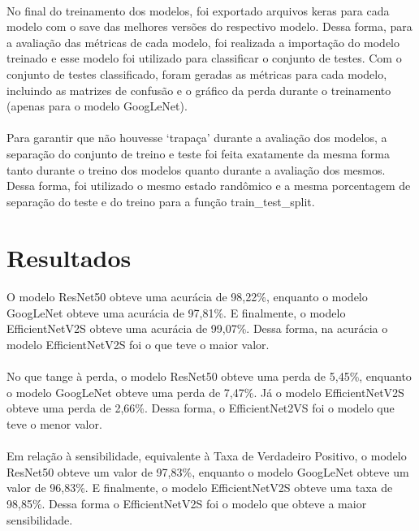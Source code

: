 \documentclass[12pt]{article}
\begin{document}
\paragraph{}No final do treinamento dos modelos, foi exportado arquivos keras para cada modelo com o save das melhores versões do respectivo modelo. Dessa forma, para a avaliação das métricas de cada modelo, foi realizada a importação do modelo treinado e esse modelo foi utilizado para classificar o conjunto de testes. Com o conjunto de testes classificado, foram geradas as métricas para cada modelo, incluindo as matrizes de confusão e o gráfico da perda durante o treinamento (apenas para o modelo GoogLeNet).

\paragraph{}Para garantir que não houvesse ‘trapaça’ durante a avaliação dos modelos, a separação do conjunto de treino e teste foi feita exatamente da mesma forma tanto durante o treino dos modelos quanto durante a avaliação dos mesmos. Dessa forma, foi utilizado o mesmo estado randômico e a mesma porcentagem de separação do teste e do treino para a função train\_test\_split.

\section{Resultados}

\paragraph{}O modelo ResNet50 obteve uma acurácia de 98,22\%, enquanto o modelo GoogLeNet obteve uma acurácia de 97,81\%. E finalmente, o modelo EfficientNetV2S obteve uma acurácia de 99,07\%. Dessa forma, na acurácia o modelo EfficientNetV2S foi o que teve o maior valor.

\paragraph{}No que tange à perda, o modelo ResNet50 obteve uma perda de 5,45\%, enquanto o modelo GoogLeNet obteve uma perda de 7,47\%. Já o modelo EfficientNetV2S obteve uma perda de 2,66\%. Dessa forma, o EfficientNet2VS foi o modelo que teve o menor valor.

\paragraph{}Em relação à sensibilidade, equivalente à Taxa de Verdadeiro Positivo, o modelo ResNet50 obteve um valor de 97,83\%, enquanto o modelo GoogLeNet obteve um valor de 96,83\%. E finalmente, o modelo EfficientNetV2S obteve uma taxa de 98,85\%. Dessa forma o EfficientNetV2S foi o modelo que obteve a maior sensibilidade.
\end{document}
